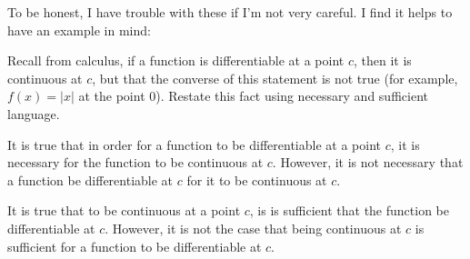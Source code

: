 \documentclass[12pt]{article}
\begin{document}
To be honest, I have trouble with these if I'm not very careful.  I find it helps to have an example in mind:

\begin{example}
 Recall from calculus, if a function is differentiable at a point $c$, then it is continuous at $c$, but that the converse of this statement is not true (for example, $f(x) = |x|$ at the point 0).  Restate this fact using necessary and sufficient language.

 \begin{solution}
  It is true that in order for a function to be differentiable at a point $c$, it is necessary for the function to be continuous at $c$.  However, it is not necessary that a function be differentiable at $c$ for it to be continuous at $c$.

  It is true that to be continuous at a point $c$, is is sufficient that the function be differentiable at $c$.  However, it is not the case that being continuous at $c$ is sufficient for a function to be differentiable at $c$.
 \end{solution}
\end{example}
\end{document}
